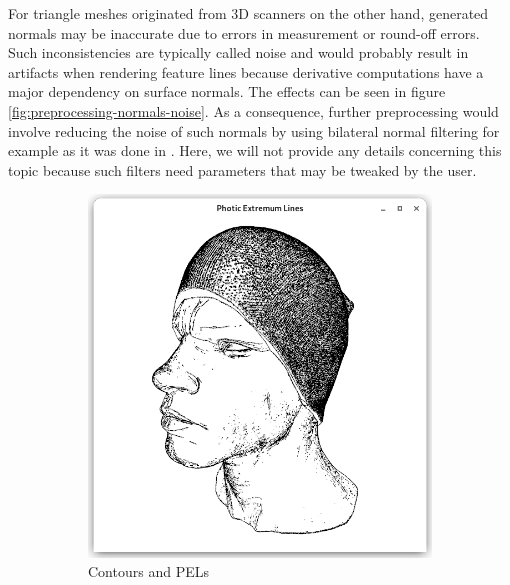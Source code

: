 \documentclass[9pt,fleqn,twoside,twocolumn]{stdglobal}
\begin{document}
    For triangle meshes originated from 3D scanners on the other hand, generated normals may be inaccurate due to errors in measurement or round-off errors.
    Such inconsistencies are typically called noise and would probably result in artifacts when rendering feature lines because derivative computations have a major dependency on surface normals.
    The effects can be seen in figure \ref{fig:preprocessing-normals-noise}.
    As a consequence, further preprocessing would involve reducing the noise of such normals by using bilateral normal filtering for example as it was done in \textcite{xie2007}.
    Here, we will not provide any details concerning this topic because such filters need parameters that may be tweaked by the user.

    \begin{figure}[h]
      \centering
      \begin{subfigure}[b]{0.49\linewidth}
        \centering
        \includegraphics[width=\textwidth,trim={15px 15 15 50},clip]{images/head-contour-pel-shader.png}
        \caption{Contours and PELs}
      \end{subfigure}
      \begin{subfigure}[b]{0.49\linewidth}
        \centering

\end{subfigure}
\end{figure}
\end{document}
